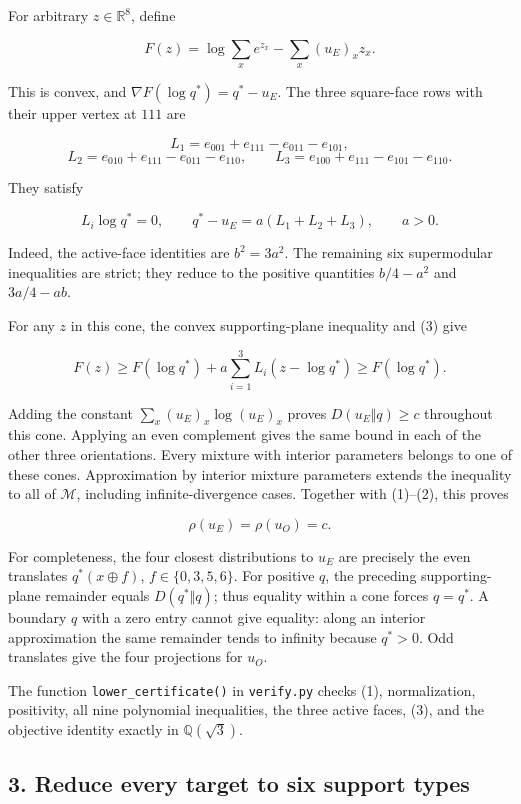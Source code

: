 For arbitrary \(z\in\mathbb R^8\), define

\[
F(z)=\log\sum_xe^{z_x}-\sum_x(u_E)_x z_x.
\]

This is convex, and \(\nabla F(\log q^*)=q^*-u_E\). The three
square-face rows with their upper vertex at \(111\) are

\[
L_1=e_{001}+e_{111}-e_{011}-e_{101},
\] \[
L_2=e_{010}+e_{111}-e_{011}-e_{110},\qquad
L_3=e_{100}+e_{111}-e_{101}-e_{110}.
\]

They satisfy

\[
L_i\log q^*=0,\qquad
q^*-u_E=a(L_1+L_2+L_3),\qquad a>0.
\tag{3}
\]

Indeed, the active-face identities are \(b^2=3a^2\). The remaining six
supermodular inequalities are strict; they reduce to the positive
quantities \(b/4-a^2\) and \(3a/4-ab\).

For any \(z\) in this cone, the convex supporting-plane inequality and
(3) give

\[
F(z)\ge F(\log q^*)+a\sum_{i=1}^3L_i(z-\log q^*)
\ge F(\log q^*).
\]

Adding the constant \(\sum_x(u_E)_x\log(u_E)_x\) proves
\(D(u_E\Vert q)\ge c\) throughout this cone. Applying an even complement
gives the same bound in each of the other three orientations. Every
mixture with interior parameters belongs to one of these cones.
Approximation by interior mixture parameters extends the inequality to
all of \(\mathcal M\), including infinite-divergence cases. Together
with (1)--(2), this proves

\[
\rho(u_E)=\rho(u_O)=c.
\tag{4}
\]

For completeness, the four closest distributions to \(u_E\) are
precisely the even translates \(q^*(x\mathbin\oplus f)\),
\(f\in\{0,3,5,6\}\). For positive \(q\), the preceding supporting-plane
remainder equals \(D(q^*\Vert q)\); thus equality within a cone forces
\(q=q^*\). A boundary \(q\) with a zero entry cannot give equality:
along an interior approximation the same remainder tends to infinity
because \(q^*>0\). Odd translates give the four projections for \(u_O\).

The function \texttt{lower\_certificate()} in \texttt{verify.py} checks
(1), normalization, positivity, all nine polynomial inequalities, the
three active faces, (3), and the objective identity exactly in
\(\mathbb Q(\sqrt3)\).

\subsection{3. Reduce every target to six support
types}\label{reduce-every-target-to-six-support-types}


